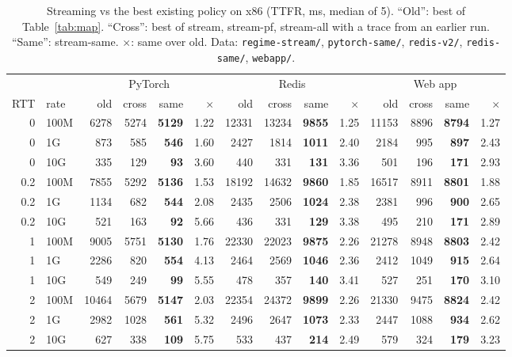 \documentclass[conference]{IEEEtran}
\newcommand{\mode}[1]{\textsf{#1}}
\begin{document}
\begin{table}[t]
\centering
\caption{Streaming vs the best existing policy on x86 (TTFR, ms, median of
5). ``Old'': best of Table~\ref{tab:map}. ``Cross'': best of \mode{stream},
\mode{stream-pf}, \mode{stream-all} with a trace from an earlier run.
``Same'': \mode{stream-same}. $\times$: same over old.
{Data: \texttt{regime-stream/}, \texttt{pytorch-same/},
\texttt{redis-v2/}, \texttt{redis-same/}, \texttt{webapp/}.}}
\label{tab:stream}
\setlength{\tabcolsep}{4pt}
\begin{tabular}{@{}rl|rrrr|rrrr|rrrr@{}}
\toprule
 & & \multicolumn{4}{c|}{PyTorch} & \multicolumn{4}{c|}{Redis}
   & \multicolumn{4}{c}{Web app} \\
RTT & rate & old & cross & same & $\times$ & old & cross & same & $\times$
           & old & cross & same & $\times$ \\
\midrule
0   & 100M & 6278 & 5274 & \textbf{5129} & 1.22 & 12331 & 13234 & \textbf{9855} & 1.25 & 11153 & 8896 & \textbf{8794} & 1.27 \\
0   & 1G   & 873  & 585  & \textbf{546}  & 1.60 & 2427 & 1814 & \textbf{1011} & 2.40 & 2184 & 995 & \textbf{897} & 2.43 \\
0   & 10G  & 335  & 129  & \textbf{93}   & 3.60 & 440  & 331  & \textbf{131} & 3.36 & 501 & 196 & \textbf{171} & 2.93 \\
0.2 & 100M & 7855 & 5292 & \textbf{5136} & 1.53 & 18192 & 14632 & \textbf{9860} & 1.85 & 16517 & 8911 & \textbf{8801} & 1.88 \\
0.2 & 1G   & 1134 & 682  & \textbf{544}  & 2.08 & 2435 & 2506 & \textbf{1024} & 2.38 & 2381 & 996 & \textbf{900} & 2.65 \\
0.2 & 10G  & 521  & 163  & \textbf{92}   & 5.66 & 436  & 331  & \textbf{129} & 3.38 & 495 & 210 & \textbf{171} & 2.89 \\
1   & 100M & 9005 & 5751 & \textbf{5130} & 1.76 & 22330 & 22023 & \textbf{9875} & 2.26 & 21278 & 8948 & \textbf{8803} & 2.42 \\
1   & 1G   & 2286 & 820  & \textbf{554}  & 4.13 & 2464 & 2569 & \textbf{1046} & 2.36 & 2412 & 1049 & \textbf{915} & 2.64 \\
1   & 10G  & 549  & 249  & \textbf{99}   & 5.55 & 478  & 357  & \textbf{140} & 3.41 & 527 & 251 & \textbf{170} & 3.10 \\
2   & 100M & 10464 & 5679 & \textbf{5147} & 2.03 & 22354 & 24372 & \textbf{9899} & 2.26 & 21330 & 9475 & \textbf{8824} & 2.42 \\
2   & 1G   & 2982 & 1028 & \textbf{561}  & 5.32 & 2496 & 2647 & \textbf{1073} & 2.33 & 2447 & 1088 & \textbf{934} & 2.62 \\
2   & 10G  & 627  & 338  & \textbf{109}  & 5.75 & 533  & 437  & \textbf{214} & 2.49 & 579 & 324 & \textbf{179} & 3.23 \\
\bottomrule
\end{tabular}
\end{table}
\end{document}
